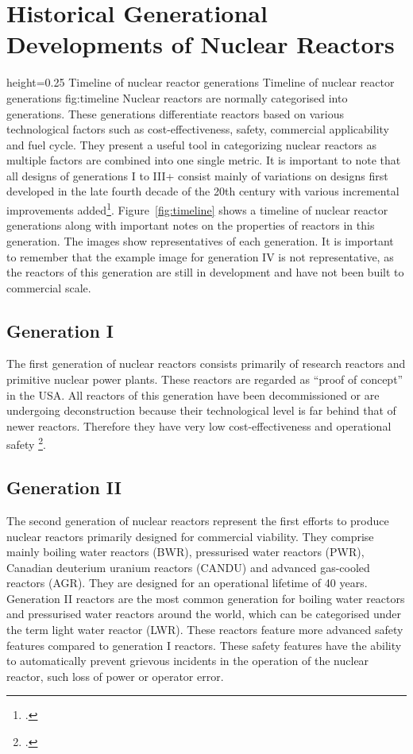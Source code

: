 \chapter{Historical Generational Developments of Nuclear Reactors}
    {height=0.25\textheight}
    {Timeline of nuclear reactor generations}
    {Timeline of nuclear reactor generations}
    {fig:timeline}
Nuclear reactors are normally categorised into generations. These generations differentiate
reactors based on various technological factors such as cost-effectiveness, safety, commercial applicability and
fuel cycle. They present a useful tool in categorizing nuclear reactors as multiple factors
are combined into one single metric. It is important to note that all designs of generations I
to III+ consist mainly of variations on designs first developed in the late fourth decade of the 20th century with
various incremental improvements added\footcite[1,2]{Gen2gen}.
Figure~\ref{fig:timeline} shows a timeline of nuclear reactor generations along with important notes
on the properties of reactors in this generation. The images show representatives of each generation.
It is important to remember that the example image for generation IV is not representative, as the reactors
of this generation are still in development and have not been built to commercial scale.
\section{Generation I}
The first generation of nuclear reactors consists primarily of research reactors and primitive nuclear
power plants. These reactors are regarded as \enquote{proof of concept} in the USA. All reactors of
this generation have been decommissioned or are undergoing deconstruction because their technological level
is far behind that of newer reactors. Therefore they have very low cost-effectiveness and operational
safety \footcite[3]{Gen2gen}.
\section{Generation II}
The second generation of nuclear reactors represent the first efforts to produce nuclear reactors primarily
designed for commercial viability. They comprise mainly boiling water reactors (BWR), pressurised water reactors (PWR),
Canadian deuterium uranium reactors (CANDU) and advanced gas-cooled reactors (AGR).  They are designed
for an operational lifetime of 40 years. Generation II reactors are the most common generation for boiling
water reactors and pressurised water reactors around the world, which can be categorised under the term
light water reactor (LWR). These reactors feature more advanced safety features compared to generation I
reactors. These safety features have the ability to automatically prevent grievous incidents in the operation
of the nuclear reactor, such loss of power or operator error.

